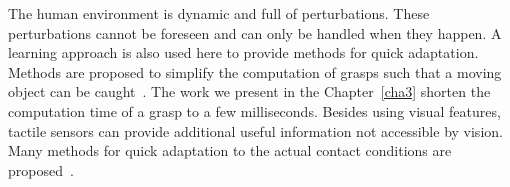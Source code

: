 The human environment is dynamic and full of perturbations. These perturbations cannot be foreseen and can only be handled when they happen. A learning approach is also used here to provide methods for quick adaptation. Methods are proposed to simplify the computation of grasps such that a moving object can be caught~\citep{harada2008fast,kim2012}. The work we present in the Chapter~\ref{cha3} shorten the computation time of a grasp to a few milliseconds.
Besides using visual features, tactile sensors can provide additional useful information not accessible by vision. Many methods for quick adaptation to the actual contact conditions are proposed~\citep{hsiao2010contact,hsiao2011robust,kazemi2012robust,sauser2011iterative,li2014learning}.




